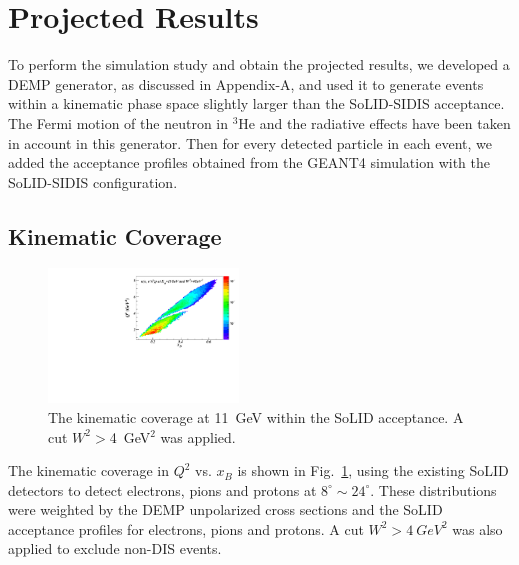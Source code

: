 \section{Projected Results}

To perform the simulation study and obtain the projected results, we developed
a DEMP generator, as discussed in Appendix-A, and used it to generate events
within a kinematic phase space slightly larger than the SoLID-SIDIS acceptance.
The Fermi motion of the neutron in $\mathrm{^{3}He}$ and the radiative effects have
been taken in account in this generator.  Then for every detected
particle in each event, we added the acceptance profiles obtained from the
GEANT4 simulation with the SoLID-SIDIS configuration.

\subsection{Kinematic Coverage}
\begin{figure}[!ht]
 \begin{center}
      \includegraphics[type=pdf,
        ext=.pdf,read=.pdf,width=0.45\textwidth]{./figures//Q2_x_02Hz}
  
   \caption{\footnotesize{The
kinematic coverage at 11~GeV within the SoLID acceptance. A cut $W^2>$4~GeV$^2$ was applied. }}
  \label{kin_cor}
  \end{center}
\end{figure}
The kinematic coverage in $Q^{2}$ vs. $x_{B}$ is shown in Fig.~\ref{kin_cor},
using the existing SoLID detectors to detect electrons, pions and protons at
$8^{\circ}\sim24^{\circ}$. These distributions were
weighted by the DEMP unpolarized cross sections and the SoLID acceptance profiles for electrons, pions and protons. 
A cut $W^{2}>4~GeV^{2}$ was also applied to exclude non-DIS events.
